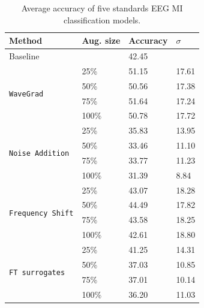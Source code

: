 \begin{table}[ht!]
    \centering
    \caption{Average accuracy of five standards EEG MI classification models.}
    \label{table:AverageAccuracy}
    \begin{tabular}{llll}
        \hline
        Method                           & Aug. size & Accuracy & \(\sigma\)            \\
        \hline
        Baseline                         &           & 42.45    &                       \\
        \hline
        \multirow{4}{*}{\texttt{WaveGrad}}        & 25\%      & 51.15    & 17.61                 \\
                                        & 50\%      & 50.56    & 17.38                 \\
                                        & 75\%      & 51.64    & 17.24                 \\
                                        & 100\%     & 50.78    & 17.72                 \\
        \hline
        \multirow{4}{*}{\texttt{Noise Addition}}  & 25\%      & 35.83    & 13.95                 \\
                                        & 50\%      & 33.46    & 11.10                 \\
                                        & 75\%      & 33.77    & 11.23                 \\
                                        & 100\%     & 31.39    & 8.84                  \\
        \hline
        \multirow{4}{*}{\texttt{Frequency Shift}} & 25\%      & 43.07    & 18.28                 \\
                                        & 50\%      & 44.49    & 17.82                 \\
                                        & 75\%      & 43.58    & 18.25                 \\
                                        & 100\%     & 42.61    & 18.80                 \\
        \hline
        \multirow{4}{*}{\texttt{FT surrogates}}   & 25\%      & 41.25    & 14.31                 \\
                                        & 50\%      & 37.03    & 10.85                 \\
                                        & 75\%      & 37.01    & 10.14                 \\
                                        & 100\%     & 36.20    & 11.03                 \\

\end{tabular}
\end{table}

